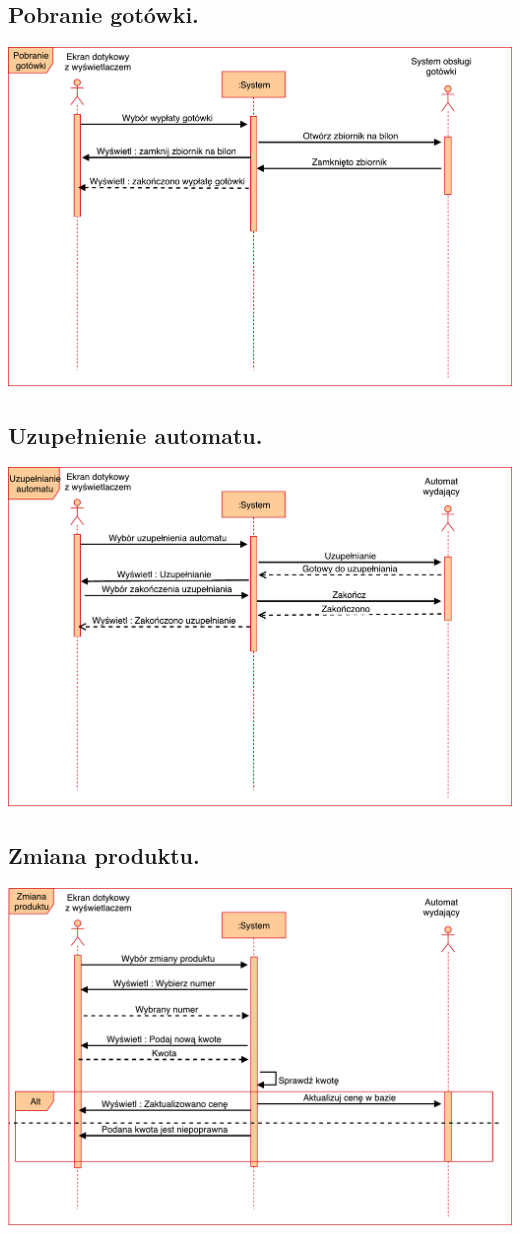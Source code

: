 \documentclass[11pt]{article}
\begin{document}
		\subsection{Pobranie gotówki.}
		\begin{center}
			\includegraphics[scale=0.65]{PobranieGotowki.pdf}
		\end{center}
		\newpage
		\subsection{Uzupełnienie automatu.}
		\begin{center}
			\includegraphics[scale=0.65]{UzupelnianieAutomatu.pdf}
		\end{center}
		\newpage
		\subsection{Zmiana produktu.}
		\begin{center}
			\includegraphics[scale=0.65]{ZmianaProduktu.pdf}
		\end{center}
	
\end{document}

